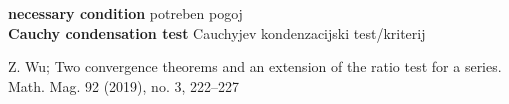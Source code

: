 \documentclass[a4paper,12pt]{article}
\newcommand{\geslo}[2]{\noindent\textbf{#1} \quad \hangindent=1cm #2\\[-1pc]}
\begin{document}
\geslo{necessary condition}{potreben pogoj}

\geslo{Cauchy condensation test}{Cauchyjev kondenzacijski test/kriterij}






\begin{abstract}
\end{abstract}


\tableofcontents

\pagebreak










\begin{thebibliography}{1}
    Z. Wu; Two convergence theorems and an extension of the ratio test for a
    series. Math. Mag. 92 (2019), no. 3, 222–227
\end{thebibliography}

\end{document}
